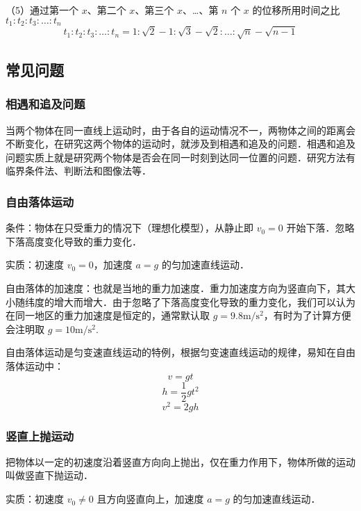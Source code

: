 （5）通过第一个 $x$、第二个 $x$、第三个 $x$、…、第 $n$ 个 $x$ 的位移所用时间之比 $t_1:t_2:t_3:\dots:t_n$
\begin{equation}
t_1:t_2:t_3:\dots:t_n=1:\sqrt{2}-1:\sqrt{3}-\sqrt{2}:\dots:\sqrt{n}-\sqrt{n-1}
\end{equation}

\subsection{常见问题}
\subsubsection{相遇和追及问题}
当两个物体在同一直线上运动时，由于各自的运动情况不一，两物体之间的距离会不断变化，在研究这两个物体的运动时，就涉及到相遇和追及的问题．相遇和追及问题实质上就是研究两个物体是否会在同一时刻到达同一位置的问题．研究方法有临界条件法、判断法和图像法等．

\subsubsection{自由落体运动}
条件：物体在只受重力的情况下（理想化模型），从静止即 $v_0=0$ 开始下落．忽略下落高度变化导致的重力变化．

实质：初速度 $v_0=0$，加速度 $a=g$ 的匀加速直线运动．

自由落体的加速度：也就是当地的重力加速度．重力加速度方向为竖直向下，其大小随纬度的增大而增大．由于忽略了下落高度变化导致的重力变化，我们可以认为在同一地区的重力加速度是恒定的，通常默认取 $g=9.8\mathrm{m/s^2}$，有时为了计算方便会注明取 $g=10\mathrm{m/s^2}$.

自由落体运动是匀变速直线运动的特例，根据匀变速直线运动的规律，易知在自由落体运动中：
\begin{equation}
v=gt
\end{equation}
\begin{equation}
h=\frac12gt^2
\end{equation}
\begin{equation}
v^2=2gh
\end{equation}

\subsubsection{竖直上抛运动}
把物体以一定的初速度沿着竖直方向向上抛出，仅在重力作用下，物体所做的运动叫做竖直下抛运动．

实质：初速度 $v_0\neq0$ 且方向竖直向上，加速度 $a=g$ 的匀加速直线运动．


